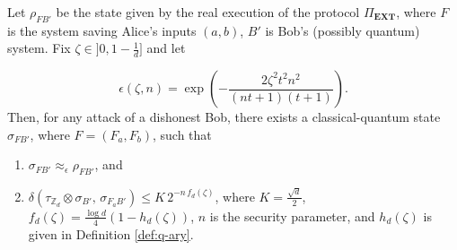 \begin{lemma}
Let $\rho_{F B'}$ be the state given by the real execution of the protocol $\Pi_{\textbf{EXT}}$, where $F$ is the system saving Alice's inputs $(a,b)$, $B'$ is Bob's (possibly quantum) system. Fix $\zeta \in ]0, 1-\frac{1}{d}]$ and let 

$$\epsilon(\zeta, n) = \exp( -\frac{2 \zeta^2t^2n^2}{(nt+1)(t+1)}).$$
Then, for any attack of a dishonest Bob, there exists a classical-quantum state  $\sigma_{F B'}$, where   $F = (F_{a}, F_{b})$, such that 

\begin{enumerate}
    \item $ \sigma_{F B'} \approx_{\epsilon} \rho_{F B'}$, and
    \item  $\delta( \tau_{\mathbb{Z}_d} \otimes \sigma_{B'},\, \sigma_{F_{a} B'} ) \leq K\, 2^{-n \, f_d(\zeta)}$, where $K = \frac{\sqrt{d}}{2}$, $f_d(\zeta) = \frac{\log d}{4} (1-h_d(\zeta))$, $n$ is the security parameter, and $h_d(\zeta)$  is given in Definition \ref{def:q-ary}.
\end{enumerate}

\label{lemma:extraction}
\end{lemma}
